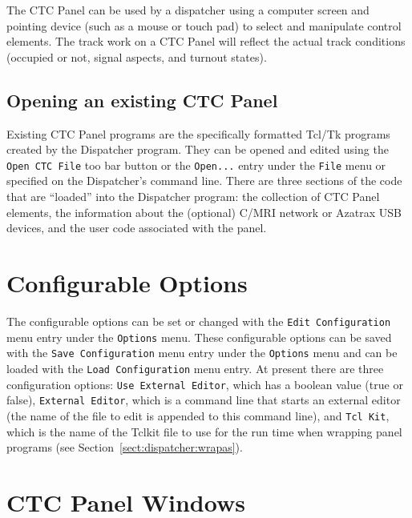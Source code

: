 The CTC Panel can be used by a dispatcher using a computer screen and
pointing device (such as a mouse or touch pad) to select and manipulate
control elements. The track work on a CTC Panel will reflect the actual
track conditions (occupied or not, signal aspects, and turnout states).

\subsection{Opening an existing CTC Panel}

Existing CTC Panel programs are the specifically formatted Tcl/Tk
programs created by the Dispatcher program.  They can be opened and
edited using the \verb=Open CTC File= too bar button or the
\verb=Open...= entry under the \verb=File= menu or specified on the
Dispatcher's command line.  There are three sections of the code that
are ``loaded'' into the Dispatcher program: the collection of CTC Panel
elements, the information about the (optional) C/MRI network or Azatrax
USB devices, and the user code associated with the panel.

\section{Configurable Options}
\label{sect:dispatcher:configopts}

The configurable options can be set or changed with the 
\verb=Edit Configuration= menu entry under the \verb=Options= menu. These
configurable options can be saved with the \verb=Save Configuration=
menu entry under the \verb=Options= menu and can be loaded with the 
\verb=Load Configuration= menu entry.  At present there are three
configuration options: \verb=Use External Editor=, which has a boolean
value (true or false), \verb=External Editor=, which is a
command line that starts an external editor (the name of the file
to edit is appended to this command line), and \verb=Tcl Kit=, which is
the name of the Tclkit file to use for the run time when wrapping panel
programs (see Section~\ref{sect:dispatcher:wrapas}).

\section{CTC Panel Windows}

